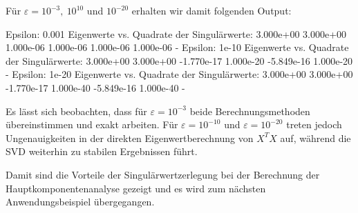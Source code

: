 Für \(\varepsilon=10^{-3},\ 10^{10}\) und \(10^{-20}\) erhalten wir damit folgenden Output: 
\begin{outputcode}
    Epsilon: 0.001
    Eigenwerte vs. Quadrate der Singulärwerte:
    3.000e+00        3.000e+00
    1.000e-06        1.000e-06
    1.000e-06        1.000e-06
    -
    Epsilon: 1e-10
    Eigenwerte vs. Quadrate der Singulärwerte:
    3.000e+00        3.000e+00
    -1.770e-17       1.000e-20
    -5.849e-16       1.000e-20
    -
    Epsilon: 1e-20
    Eigenwerte vs. Quadrate der Singulärwerte:
    3.000e+00        3.000e+00
    -1.770e-17       1.000e-40
    -5.849e-16       1.000e-40
    -
\end{outputcode}
Es lässt sich beobachten, dass für \(\varepsilon = 10^{-3}\) beide Berechnungsmethoden übereinstimmen und exakt arbeiten. 
Für \(\varepsilon=10^{-10}\) und \(\varepsilon = 10^{-20}\) treten jedoch Ungenauigkeiten in der direkten Eigenwertberechnung von \(X^{T}X\) auf, während die SVD weiterhin zu stabilen Ergebnissen führt.

Damit sind die Vorteile der Singulärwertzerlegung bei der Berechnung der Hauptkomponentenanalyse gezeigt und es wird zum nächsten Anwendungsbeispiel übergegangen.
